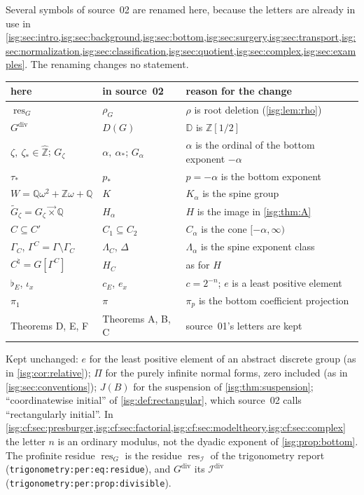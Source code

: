 \documentclass[11pt]{article}
\theoremstyle{definition}
\theoremstyle{remark}
\newcommand{\Z}{\mathbb{Z}}
\newcommand{\D}{\mathbb{D}}
\newcommand{\lex}{\mathbin{\overrightarrow{\times}}}
\newcommand{\Q}{\mathbb{Q}}
\newcommand{\Zhat}{\widehat{\Z}}
\newcommand{\res}{\operatorname{res}}
\newcommand{\dv}{\mathrm{div}}
\newcommand{\cmp}[1]{\flat_{#1}}
\newcommand{\replabel}[1]{\nolinkurl{#1}}
\begin{document}
Several symbols of source~02 are renamed here, because the letters are
already in use in \cref{isg:sec:intro,isg:sec:background,isg:sec:bottom,isg:sec:surgery,isg:sec:transport,isg:sec:normalization,isg:sec:classification,isg:sec:quotient,isg:sec:complex,isg:sec:examples}.
The renaming changes no statement.
\begin{center}\small
\begin{tabular}{@{}lll@{}}
\toprule
here & in source~02 & reason for the change\\
\midrule
$\res_G$ & $\rho_G$ & $\rho$ is root deletion (\cref{isg:lem:rho})\\
$G^{\dv}$ & $D(G)$ & $\D$ is $\Z[1/2]$\\
$\zeta,\ \zeta_*\in\Zhat$; $G_\zeta$ & $\alpha,\ \alpha_*$; $G_\alpha$ &
 $\alpha$ is the ordinal of the bottom exponent $-\alpha$\\
$\tau_*$ & $p_*$ & $p=-\alpha$ is the bottom exponent\\
$W=\Q\omega^2+\Z\omega+\Q$ & $K$ & $K_\alpha$ is the spine group\\
$\widetilde G_\zeta=G_\zeta\lex\Q$ & $H_\alpha$ & $H$ is the image in
 \cref{isg:thm:A}\\
$C\subseteq C'$ & $C_1\subseteq C_2$ & $C_\alpha$ is the cone
 $[-\alpha,\infty)$\\
$\Gamma_C$, $\Gamma^C=\Gamma\setminus\Gamma_C$ & $\Lambda_C$, $\Delta$ &
 $\Lambda_\alpha$ is the spine exponent class\\
$C^\natural=G[\Gamma^C]$ & $H_C$ & as for $H$\\
$\cmp E$, $\iota_x$ & $c_E$, $e_x$ & $c=2^{-n}$; $e$ is a least positive
 element\\
$\pi_1$ & $\pi$ & $\pi_p$ is the bottom coefficient projection\\
Theorems D, E, F & Theorems A, B, C & source~01's letters are kept\\
\bottomrule
\end{tabular}
\end{center}
Kept unchanged: $e$ for the least positive element of an abstract
discrete group (as in \cref{isg:cor:relative}); $\Pi$ for the purely
infinite normal forms, zero included (as in \cref{isg:sec:conventions});
$J(B)$ for the suspension of \cref{isg:thm:suspension}; ``coordinatewise
initial'' of \cref{isg:def:rectangular}, which source~02 calls
``rectangularly initial''. In
\cref{isg:cf:sec:presburger,isg:cf:sec:factorial,isg:cf:sec:modeltheory,isg:cf:sec:complex}
the letter $n$ is an ordinary modulus, not the dyadic exponent of
\cref{isg:prop:bottom}. The profinite residue $\res_G$ is the residue
$\res_{\mathcal I}$ of the trigonometry report
(\replabel{trigonometry:per:eq:residue}), and $G^{\dv}$ its
$\mathcal I^{\mathrm{div}}$ (\replabel{trigonometry:per:prop:divisible}).
\end{document}
